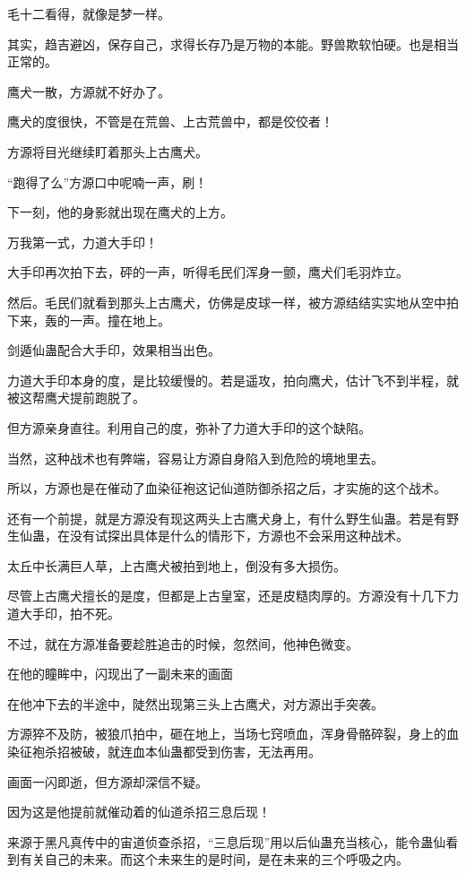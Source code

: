 \begin{this_body}
毛十二看得，就像是梦一样。

其实，趋吉避凶，保存自己，求得长存乃是万物的本能。野兽欺软怕硬。也是相当正常的。

鹰犬一散，方源就不好办了。

鹰犬的度很快，不管是在荒兽、上古荒兽中，都是佼佼者！

方源将目光继续盯着那头上古鹰犬。

“跑得了么”方源口中呢喃一声，刷！

下一刻，他的身影就出现在鹰犬的上方。

万我第一式，力道大手印！

大手印再次拍下去，砰的一声，听得毛民们浑身一颤，鹰犬们毛羽炸立。

然后。毛民们就看到那头上古鹰犬，仿佛是皮球一样，被方源结结实实地从空中拍下来，轰的一声。撞在地上。

剑遁仙蛊配合大手印，效果相当出色。

力道大手印本身的度，是比较缓慢的。若是遥攻，拍向鹰犬，估计飞不到半程，就被这帮鹰犬提前跑脱了。

但方源亲身直往。利用自己的度，弥补了力道大手印的这个缺陷。

当然，这种战术也有弊端，容易让方源自身陷入到危险的境地里去。

所以，方源也是在催动了血染征袍这记仙道防御杀招之后，才实施的这个战术。

还有一个前提，就是方源没有现这两头上古鹰犬身上，有什么野生仙蛊。若是有野生仙蛊，在没有试探出具体是什么的情形下，方源也不会采用这种战术。

太丘中长满巨人草，上古鹰犬被拍到地上，倒没有多大损伤。

尽管上古鹰犬擅长的是度，但都是上古皇室，还是皮糙肉厚的。方源没有十几下力道大手印，拍不死。

不过，就在方源准备要趁胜追击的时候，忽然间，他神色微变。

在他的瞳眸中，闪现出了一副未来的画面

在他冲下去的半途中，陡然出现第三头上古鹰犬，对方源出手突袭。

方源猝不及防，被狼爪拍中，砸在地上，当场七窍喷血，浑身骨骼碎裂，身上的血染征袍杀招被破，就连血本仙蛊都受到伤害，无法再用。

画面一闪即逝，但方源却深信不疑。

因为这是他提前就催动着的仙道杀招三息后现！

来源于黑凡真传中的宙道侦查杀招，“三息后现”用以后仙蛊充当核心，能令蛊仙看到有关自己的未来。而这个未来生的是时间，是在未来的三个呼吸之内。


\end{this_body}
